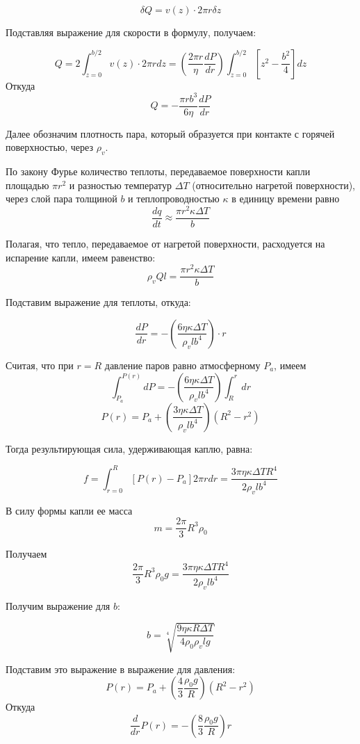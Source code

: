 \documentclass[14 pt]{extreport}
\def\cd{\cdot}
\begin{document}
	\[\delta Q = v(z) \cd 2\pi r \delta z\]
	
	Подставляя выражение для скорости в формулу, получаем:
	
	\[Q = 2 \int_{z = 0}^{b/2} v(z) \cd 2\pi r dz = \left( \dfrac{2\pi r}{\eta} \dfrac{dP}{dr} \right) \int_{z = 0}^{b/2}\left[ z^{2} - \dfrac{b^{2}}{4} \right]dz  \]
	Откуда
	\[Q = -\dfrac{\pi r b^{3}}{6\eta} \dfrac{dP}{dr}\]
	
	Далее обозначим плотность пара, который образуется при контакте с горячей поверхностью, через $ \rho_{v} $.
	
	По закону Фурье количество теплоты, передаваемое поверхности капли площадью $ \pi r^{2} $ и разностью температур $ \varDelta T $ (относительно нагретой поверхности), через слой пара толщиной $ b $ и теплопроводностью $ \kappa $ в единицу времени равно
	\[\dfrac{dq}{dt} \approx \dfrac{\pi r^{2} \kappa \varDelta T}{b}\]
	
	Полагая, что тепло, передаваемое от нагретой поверхности, расходуется на испарение капли, имеем равенство:
	\[\rho_{v}Ql = \dfrac{\pi r^{2} \kappa \varDelta T}{b}\]
	
	Подставим выражение для теплоты, откуда:
	
	\[\dfrac{dP}{dr} = -\left( \dfrac{6\eta \kappa \varDelta T}{\rho_{v}lb^4} \right) \cd r \]
	
	Считая, что при $ r = R $ давление паров равно атмосферному $ P_{a} $, имеем
	\[\int_{P_{a}}^{P(r)}dP = - \left( \dfrac{6\eta \kappa \varDelta T}{\rho_{v}lb^4} \right) \int_{R}^{r}dr\]
	\[P(r) = P_{a} + \left( \dfrac{3\eta \kappa \varDelta T}{\rho_{v}lb^4} \right)(R^{2} - r^{2})\]
	
	Тогда результирующая сила, удерживающая каплю, равна:
	
	\[f = \int_{r = 0}^{R}[P(r) - P_{a}] 2\pi rdr = \dfrac{3\pi \eta \kappa \varDelta T R^{4}}{2\rho_{v}lb^{4}}\]
	
	В силу формы капли ее масса 
	\[m = \dfrac{2\pi}{3}R^{3} \rho_{0}\]
	
	Получаем
	\[\dfrac{2\pi}{3}R^{3} \rho_{0} g = \dfrac{3\pi \eta \kappa \varDelta T R^{4}}{2\rho_{v}lb^{4}}\]
	
	Получим выражение для $ b $:
	
	\[b = \sqrt[4]{\dfrac{9 \eta \kappa R \varDelta T}{4 \rho_{0} \rho_{v} l g}}\]
	
	Подставим это выражение в выражение для давления:
	\[P(r) = P_{a} + \left( \dfrac{4}{3}\dfrac{\rho_{0}g}{R} \right)(R^{2} - r^{2}) \]
	Откуда
	\[\dfrac{d}{dr}P(r) = -\left( \dfrac{8}{3}\dfrac{\rho_{0}g}{R} \right)r\]
	
\end{document}
